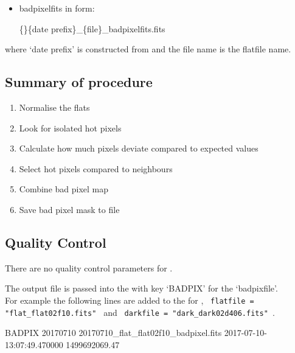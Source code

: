 \begin{itemize}
\item {badpixelfits} in form:
\begin{tcustomdir}
\{\reduceddir\}\{date prefix\}\_\{file\}\_badpixelfits.fits
\end{tcustomdir}
\end{itemize}

\noindent where `date prefix' is constructed from \argnightname and the file name is the flatfile name.

\subsection{Summary of procedure}
\begin{enumerate}
	\item Normalise the flats
	\item Look for isolated hot pixels
	\item Calculate how much pixels deviate compared to expected values
	\item Select hot pixels compared to neighbours
	\item Combine bad pixel map
	\item Save bad pixel mask to file
\end{enumerate}


\subsection{Quality Control}

There are no quality control parameters for \calbadpix.

The output file is passed into the \calibdb with key `BADPIX' for the `badpixfile'. \\

\noindent For example the following lines are added to the \calibdb for 
, {\lstinline[style=pythoninline]| flatfile = "flat_flat02f10.fits" |} and {\lstinline[style=pythoninline]| darkfile = "dark_dark02d406.fits" |}. \\

\begin{textbox}[title={In calibration database file}]
BADPIX 20170710 20170710_flat_flat02f10_badpixel.fits 2017-07-10-13:07:49.470000 1499692069.47
\end{textbox}



